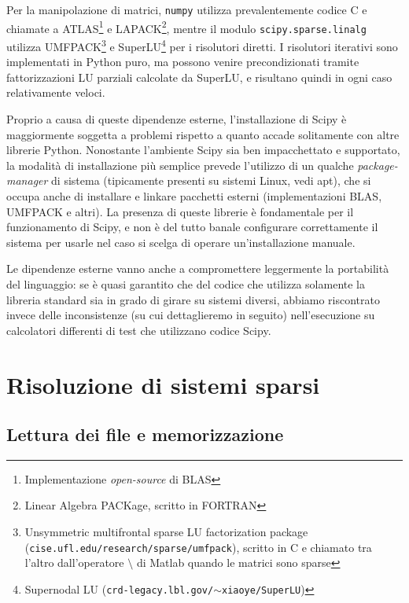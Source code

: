 \documentclass[11pt,a4paper]{scrartcl}
\begin{document}
Per la manipolazione di matrici, \texttt{numpy} utilizza prevalentemente codice C e chiamate a ATLAS\footnote{Implementazione \emph{open-source} di BLAS} e LAPACK\footnote{Linear Algebra PACKage, scritto in FORTRAN}, mentre il modulo \texttt{scipy.sparse.linalg} utilizza UMFPACK\footnote{Unsymmetric multifrontal sparse LU factorization package (\texttt{cise.ufl.edu/research/sparse/umfpack}), scritto in C e chiamato tra l'altro dall'operatore $\setminus$ di Matlab quando le matrici sono sparse} e SuperLU\footnote{Supernodal LU (\texttt{crd-legacy.lbl.gov/$\sim$xiaoye/SuperLU})} per i risolutori diretti. I risolutori iterativi sono implementati in Python puro, ma possono venire precondizionati tramite fattorizzazioni LU parziali calcolate da SuperLU, e risultano quindi in ogni caso relativamente veloci.

Proprio a causa di queste dipendenze esterne, l'installazione di Scipy è maggiormente soggetta a problemi rispetto a quanto accade solitamente con altre librerie Python. Nonostante l'ambiente Scipy sia ben impacchettato e supportato, la modalità di installazione più semplice prevede l'utilizzo di un qualche \emph{package-manager} di sistema (tipicamente presenti su sistemi Linux, vedi apt), che si occupa anche di installare e linkare pacchetti esterni (implementazioni BLAS, UMFPACK e altri). La presenza di queste librerie è fondamentale per il funzionamento di Scipy, e non è del tutto banale configurare correttamente il sistema per usarle nel caso si scelga di operare un'installazione manuale.

Le dipendenze esterne vanno anche a compromettere leggermente la portabilità del linguaggio: se è quasi garantito che del codice che utilizza solamente la libreria standard sia in grado di girare su sistemi diversi, abbiamo riscontrato invece delle inconsistenze (su cui dettaglieremo in seguito) nell'esecuzione su calcolatori differenti di test che utilizzano codice Scipy. 




\section*{Risoluzione di sistemi sparsi}

\subsection*{Lettura dei file e memorizzazione}
\end{document}
